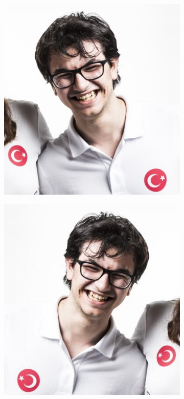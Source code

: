 \documentclass{article}
\begin{document}
\begin{figure}[!htb]
\begin{subfigure}{.25\textwidth}
  \centering
  \includegraphics[width=.99\textwidth]{ahmet.jpg}
\end{subfigure}
\begin{subfigure}{.25\textwidth}
  \centering
  \includegraphics[width=.99\textwidth]{ahmet1.jpg}

\end{subfigure}
\end{figure}
\end{document}
